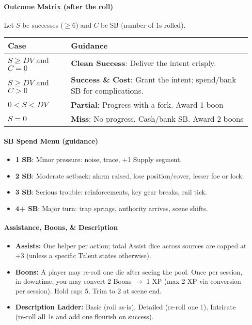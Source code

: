 \paragraph{Outcome Matrix (after the roll)}
Let $S$ be successes ($\geq 6$) and $C$ be SB (number of 1s rolled).
\begin{center}
\begin{tabular}{@{}ll@{}}
\toprule
\textbf{Case} & \textbf{Guidance} \\
\midrule
$S \geq DV$ and $C=0$ & \textbf{Clean Success}: Deliver the intent crisply. \\
$S \geq DV$ and $C>0$ & \textbf{Success \& Cost}: Grant the intent; spend/bank SB for complications. \\
$0 < S < DV$          & \textbf{Partial}: Progress with a fork. Award 1 boon \\
$S = 0$               & \textbf{Miss}: No progress. Cash/bank SB. Award 2 boons \\
\bottomrule
\end{tabular}
\end{center}

\paragraph{SB Spend Menu (guidance)}
\begin{itemize}
  \item \textbf{1 SB}: Minor pressure: noise, trace, +1 Supply segment.
  \item \textbf{2 SB}: Moderate setback: alarm raised, lose position/cover, lesser foe or lock.
  \item \textbf{3 SB}: Serious trouble: reinforcements, key gear breaks, rail tick.
  \item \textbf{4+ SB}: Major turn: trap springs, authority arrives, scene shifts.
\end{itemize}

\paragraph{Assistance, Boons, \& Description}
\begin{itemize}
  \item \textbf{Assists:} One helper per action; total Assist dice across sources are capped at +3 (unless a specific Talent states otherwise).
  \item \textbf{Boons:} A player may re-roll one die after seeing the pool. Once per session, in downtime, you may convert 2 Boons $\rightarrow$ 1 XP (max 2 XP via conversion per session). Hold cap: 5. Trim to 2 at scene end.
  \item \textbf{Description Ladder:} Basic (roll as-is), Detailed (re-roll one 1), Intricate (re-roll all 1s and add one flourish on success).
\end{itemize}

